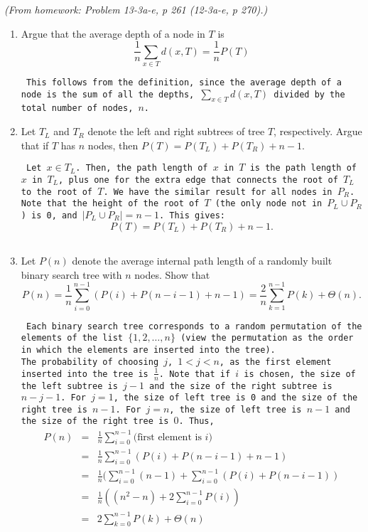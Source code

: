 \begin{enumerate}
	{\em (From homework: Problem 13-3a-e, p 261 (12-3a-e, p 270).)}

	\begin{enumerate}
	    \item Argue that the average depth of a node in $T$ is
		$$
		    \frac{1}{n} \sum_{x\in T} d(x,T) = 
			\frac{1}{n} P(T)
		$$

{\tt
This follows from the definition, since the average depth of a node is
the sum of all the depths, $\sum_{x\in T} d(x,T)$
divided by the total number of nodes, $n$.
}
	    \item Let $T_L$ and $T_R$ denote the left and right subtrees of
		tree $T$, respectively.  Argue that if $T$ has $n$
		nodes, then 
		$
		    P(T) = P(T_L) + P(T_R) + n - 1.
		$

{\tt
Let $x\in T_L$.  Then, the path length of $x$ in $T$ is the path length
of $x$ in $T_L$, plus one for the extra edge that connects the root of
$T_L$ to the root of $T$.  We have the similar result for all nodes in 
$P_R$.  Note that the height of the root of $T$ (the only node not in 
$P_L \cup P_R$) is 0, and $|P_L \cup P_R| = n-1$.  This gives:
		$$
		    P(T) = P(T_L) + P(T_R) + n - 1.
		$$
}

	    \item Let $P(n)$ denote the average internal path length of
		a randomly built binary search tree with $n$ nodes. 
		Show that
		$$
		    P(n) = \frac{1}{n} \sum_{i=0}^{n-1} 
				(P(i) + P(n-i-1) + n-1)
		    = \frac{2}{n} \sum_{k=1}^{n-1} P(k) + \Theta(n).
		$$

{\tt
Each binary search tree corresponds to a random permutation of the 
elements of the list $\{1,2,\ldots,n\}$ (view the permutation as the 
order in which the elements are inserted into the tree).  \\
The probability
of choosing $j$, $1< j < n$, as the first element inserted into
the tree is $\frac{1}{n}$.  Note that if $i$ is chosen, the size of the
left subtree is $j-1$ and the size of the right subtree is $n-j-1$.  
For $j=1$, the size of left tree is 0 and the size of the right tree is $n-1$.
For $j=n$, the size of left tree is $n-1$ and the size of the right tree is $0$.
Thus,
$$
\begin{array}{rcl}
    P(n) &=& \frac{1}{n} \sum_{i=0}^{n-1} \mbox{(first element is $i$)}\\
         &=& \frac{1}{n} \sum_{i=0}^{n-1} (P(i) + P(n-i-1) + n-1)\\
         &=& \frac{1}{n} (\sum_{i=0}^{n-1} (n-1) 
		+ \sum_{i=0}^{n-1} (P(i) + P(n-i-1))\\
         &=& \frac{1}{n} ((n^2-n) 
		+ 2 \sum_{i=0}^{n-1} P(i))\\
         &=& 2 \sum_{k=0}^{n-1} P(k) + \Theta(n) 
\end{array}
$$
}


\end{enumerate}
\end{enumerate}
